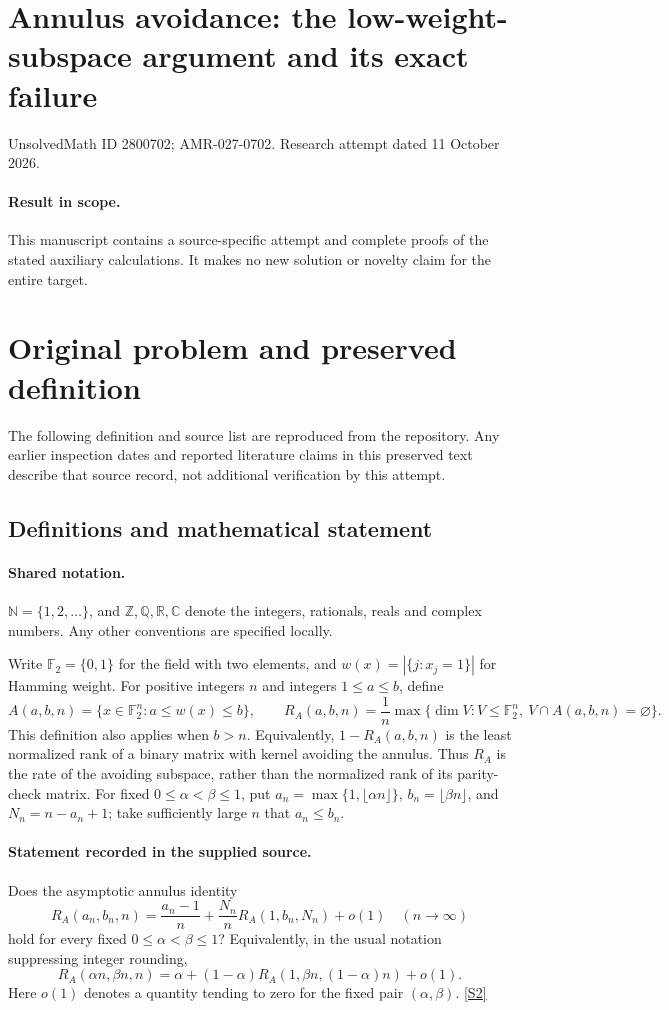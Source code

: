 \documentclass[11pt]{article}
\begin{document}
\section*{Annulus avoidance: the low-weight-subspace argument and its exact failure}
\noindent UnsolvedMath ID 2800702; AMR-027-0702. Research attempt dated 11 October 2026.
\paragraph{Result in scope.}This manuscript contains a source-specific attempt and complete proofs of the stated auxiliary calculations. It makes no new solution or novelty claim for the entire target.
\section{Original problem and preserved definition}
The following definition and source list are reproduced from the repository. Any earlier inspection dates and reported literature claims in this preserved text describe that source record, not additional verification by this attempt.
\subsection{Definitions and mathematical statement}

\paragraph{Shared notation.}$\mathbb N=\{1,2,\ldots\}$, and $\mathbb Z,\mathbb Q,\mathbb R,\mathbb C$ denote the integers, rationals, reals and complex numbers. Any other conventions are specified locally.


Write \(\mathbb F_2=\{0,1\}\) for the field with two elements, and \(w(x)=|\{j:x_j=1\}|\) for Hamming weight. For positive integers \(n\) and integers \(1\le a\le b\), define
\[A(a,b,n)=\{x\in\mathbb F_2^n:a\le w(x)\le b\},\qquad
R_A(a,b,n)=\frac1n\max\{\dim V:V\le\mathbb F_2^n,\ V\cap A(a,b,n)=\varnothing\}.\]
This definition also applies when \(b>n\). Equivalently, \(1-R_A(a,b,n)\) is the least normalized rank of a binary matrix with kernel avoiding the annulus. Thus \(R_A\) is the rate of the avoiding subspace, rather than the normalized rank of its parity-check matrix.
For fixed \(0\le\alpha<\beta\le1\), put \(a_n=\max\{1,\lfloor\alpha n\rfloor\}\), \(b_n=\lfloor\beta n\rfloor\), and \(N_n=n-a_n+1\); take sufficiently large \(n\) that \(a_n\le b_n\).
\paragraph{Statement recorded in the supplied source.}
Does the asymptotic annulus identity
\[R_A(a_n,b_n,n)=\frac{a_n-1}{n}+\frac{N_n}{n}R_A(1,b_n,N_n)+o(1)\quad(n\to\infty)\]
hold for every fixed \(0\le\alpha<\beta\le1\)? Equivalently, in the usual notation suppressing integer rounding,
\[R_A(\alpha n,\beta n,n)=\alpha+(1-\alpha)R_A(1,\beta n,(1-\alpha)n)+o(1).\]
Here \(o(1)\) denotes a quantity tending to zero for the fixed pair \((\alpha,\beta)\). \href{https://arxiv.org/pdf/1401.6528}{[S2]}
\end{document}
